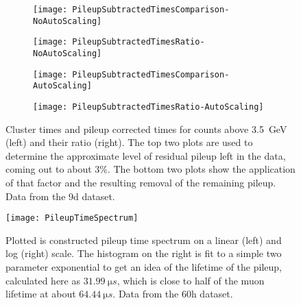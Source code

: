     \begin{figure}[]
    \centering
        \begin{subfigure}[]{0.45\textwidth}
            \centering
            \texttt{[image: PileupSubtractedTimesComparison-NoAutoScaling]}
        \end{subfigure}%
        \hspace{1cm}
        \begin{subfigure}[]{0.45\textwidth}
            \centering
            \texttt{[image: PileupSubtractedTimesRatio-NoAutoScaling]}
        \end{subfigure}

        \begin{subfigure}[]{0.45\textwidth}
            \centering
            \texttt{[image: PileupSubtractedTimesComparison-AutoScaling]}
        \end{subfigure}%
        \hspace{1cm}
        \begin{subfigure}[]{0.45\textwidth}
            \centering
            \texttt{[image: PileupSubtractedTimesRatio-AutoScaling]}
        \end{subfigure}
    \caption[Cluster times above \SI{3.5}{\GeV}]{Cluster times and pileup corrected times for counts above \SI{3.5}{\GeV} (left) and their ratio (right). The top two plots are used to determine the approximate level of residual pileup left in the data, coming out to about 3\%. The bottom two plots show the application of that factor and the resulting removal of the remaining pileup. Data from the 9d dataset.}
    \label{fig:PileupTimesRatio}
    \end{figure}



    \begin{figure}[]
        \centering
        \texttt{[image: PileupTimeSpectrum]}
        \caption[Pileup time spectrum above threshold]{Plotted is constructed pileup time spectrum on a linear (left) and log (right) scale. The histogram on the right is fit to a simple two parameter exponential to get an idea of the lifetime of the pileup, calculated here as $\SI{31.99}{\micro s}$, which is close to half of the muon lifetime at about $\SI{64.44}{\micro s}$. Data from the 60h dataset.}
        \label{fig:PileupTimeSpectrum}
    \end{figure}





